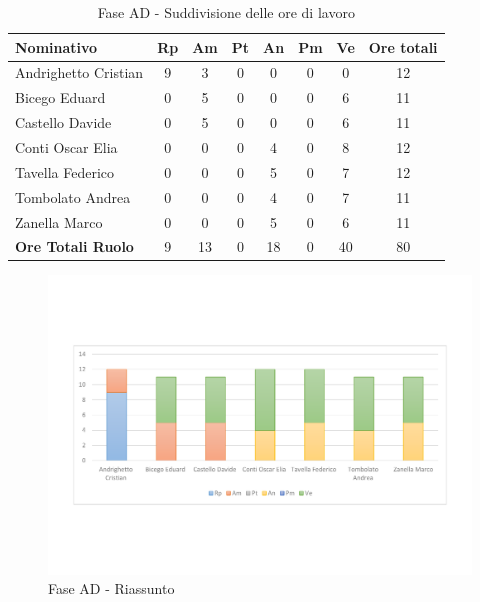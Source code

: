 \documentclass[../PianoProgetto.tex]{subfiles}
\begin{document}
	\begin{table}[h]
		\begin{tabularx}{\textwidth}{l  * {6}{C}  c}
			\toprule
			\textbf{Nominativo} & \textbf{Rp} & \textbf{Am} & \textbf{Pt} 
						& \textbf{An} & \textbf{Pm} & \textbf{Ve} & \textbf{Ore totali} \\
			\midrule
			Andrighetto Cristian & 9 & 3 &	0 &	0 & 0 & 0 & 12 \\
			Bicego Eduard & 0 & 5 & 0 & 0 & 0 & 6 & 11 \\
			Castello Davide & 0 & 5 & 0 & 0 & 0 & 6 & 11 \\
			Conti Oscar Elia & 0 & 0 &	0 &	4 & 0 & 8 & 12 \\
			Tavella Federico &	0 & 0 & 0 & 5 & 0 & 7 & 12 \\
			Tombolato Andrea & 0 & 0 &	0 &	4 & 0 & 7 & 11 \\
			Zanella Marco & 0 & 0 & 0 & 5 & 0 & 6 & 11 \\
			\midrule			
			\textbf{Ore Totali Ruolo} & 9 & 13 & 0 & 18 & 0 & 40 & 80 \\
			\bottomrule
		\end{tabularx}	
		\caption{Fase AD - Suddivisione delle ore di lavoro}
		\label{tab:faseAD_ore}	
	\end{table}
\vfill
\newpage
\vfill
	
	\begin{figure}[!h]
		\centering
		\includegraphics[width=\textwidth , trim=2cm 5cm 2cm 5cm]{grafici/AD/AD-ore-persona}
			\caption{Fase AD - Riassunto}
		\label{fig:BarChart-faseAD_ore}
	\end{figure}
	
\end{document}
